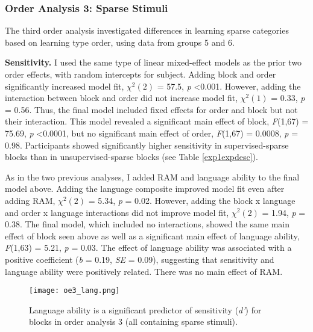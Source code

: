 \documentclass[../dissertation.tex]{subfiles}
\begin{document}
\subsubsection{Order Analysis 3: Sparse Stimuli}
	The third order analysis investigated differences in learning sparse categories based on learning type order, using data from groups 5 and 6. \par 
	\textbf{Sensitivity.} I used the same type of linear mixed-effect models as the prior two order effects, with random intercepts for subject. Adding block and order significantly increased model fit, $\chi^{2}(2)$ = 57.5, \textit{p} \textless 0.001. However, adding the interaction between block and order did not increase model fit, $\chi^{2}(1)$ = 0.33, \textit{p} = 0.56. Thus, the final model included fixed effects for order and block but not their interaction. This model revealed a significant main effect of block, \textit{F}(1,67) = 75.69, \textit{p} \textless 0.0001, but no significant main effect of order, \textit{F}(1,67) = 0.0008, \textit{p} = 0.98. Participants showed significantly higher sensitivity in supervised-sparse blocks than in unsupervised-sparse blocks (see Table \ref{exp1expdesc}). \par 
	As in the two previous analyses, I added RAM and language ability to the final model above. Adding the language composite improved model fit even after adding RAM, $\chi^{2}(2)$ = 5.34, \textit{p} = 0.02. However, adding the block x language and order x language interactions did not improve model fit, $\chi^{2}(2)$ = 1.94, \textit{p} = 0.38. The final model, which included no interactions, showed the same main effect of block seen above as well as a significant main effect of language ability, \textit{F}(1,63) = 5.21, \textit{p} = 0.03. The effect of language ability was associated with a positive coefficient (\textit{b} = 0.19, \textit{SE} = 0.09), suggesting that sensitivity and language ability were positively related. There was no main effect of RAM. \par 
	
	
\begin{wrapfigure}{L}{0.45\textwidth}
\vspace{-10pt}
\texttt{[image: oe3\_lang.png]}
\caption[Relationship between language ability and accuracy for order analysis 3]{Language ability is a significant predictor of sensitivity (\textit{d'}) for blocks in order analysis 3 (all containing sparse stimuli). }
\label{oe3_lang}
\vspace{-20pt}
\end{wrapfigure}	
\end{document}
